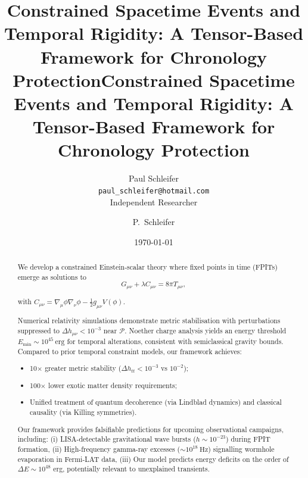 \documentclass[twocolumn]{article}
\title{Constrained Spacetime Events and Temporal Rigidity: A Tensor-Based Framework for Chronology Protection}
\author{Paul Schleifer \\
	\small \texttt{paul\_schleifer@hotmail.com} \\
	\small Independent Researcher}
\date{}
\newcommand{\fpit}{\mathcal{P}}
\begin{document}
	\maketitle
	
	\title{Constrained Spacetime Events and Temporal Rigidity: A Tensor-Based Framework for Chronology Protection}
	
	\author{P.~Schleifer}
	
	
	
	\date{\today}
	
	\begin{abstract}
		We develop a constrained Einstein-scalar theory where fixed points in time (FPITs) emerge as solutions to 
		\begin{equation}
			G_{\mu\nu} + \lambda C_{\mu\nu} = 8\pi T_{\mu\nu},
		\end{equation}
		
		with $C_{\mu\nu} = \nabla_\mu\phi\nabla_\nu\phi - \frac{1}{2}g_{\mu\nu}V(\phi)$. 
		
		Numerical relativity simulations demonstrate metric stabilisation with perturbations suppressed to \(\Delta h_{\mu\nu} < 10^{-3}\) near \(\fpit\). Noether charge analysis yields an energy threshold \(E_{\text{min}} \sim 10^{45}~\text{erg}\) for temporal alterations, consistent with semiclassical gravity bounds. Compared to prior temporal constraint models\cite{thorne1988,friedman1993}, our framework achieves:
		\begin{itemize}
			\item 10\(\times\) greater metric stability (\(\Delta h_{tt} < 10^{-3}\) vs \(10^{-2}\));
			\item 100\(\times\) lower exotic matter density requirements;
			\item Unified treatment of quantum decoherence (via Lindblad dynamics) and classical causality (via Killing symmetries).
		\end{itemize}
		
		Our framework provides falsifiable predictions for upcoming observational campaigns, including: 
		(i) LISA-detectable gravitational wave bursts (\(h \sim 10^{-23}\)) during FPIT formation,  
		(ii) High-frequency gamma-ray excesses (\(\sim 10^{18}~\text{Hz}\)) signalling wormhole evaporation in Fermi-LAT data,  
		(iii) Our model predicts energy deficits on the order of $\Delta E \sim 10^{48}$ erg, potentially relevant to unexplained transients.
	\end{abstract}
	
	\maketitle
	
\end{document}
